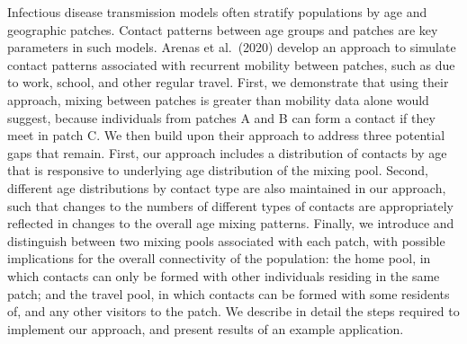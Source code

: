 Infectious disease transmission models often stratify populations by age and geographic patches.
Contact patterns between age groups and patches are key parameters in such models.
Arenas et al.\ (2020) develop an approach to simulate contact patterns associated with
recurrent mobility between patches, such as due to work, school, and other regular travel.
First, we demonstrate that using their approach, mixing between patches is greater than mobility data alone would suggest,
because individuals from patches A and B can form a contact if they meet in patch C.
We then build upon their approach to address three potential gaps that remain.
First, our approach includes a distribution of contacts by age
that is responsive to underlying age distribution of the mixing pool.
Second, different age distributions by contact type are also maintained in our approach,
such that changes to the numbers of different types of contacts
are appropriately reflected in changes to the overall age mixing patterns.
Finally, we introduce and distinguish between two mixing pools associated with each patch,
with possible implications for the overall connectivity of the population:
the home pool, in which contacts can only be formed with other individuals residing in the same patch;
and the travel pool, in which contacts can be formed with some residents of, and any other visitors to the patch.
We describe in detail the steps required to implement our approach,
and present results of an example application.

